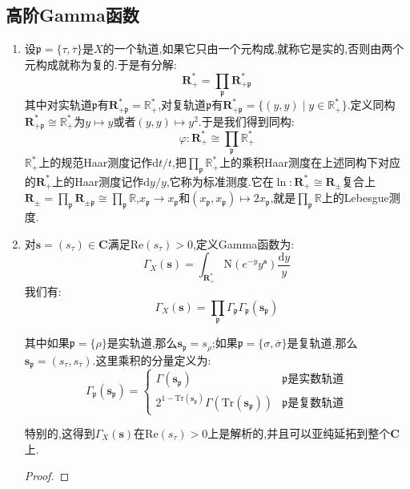 \subsection{高阶Gamma函数}
\begin{enumerate}
	\item 设$\mathfrak{p}=\{\tau,\overline{\tau}\}$是$X$的一个轨道,如果它只由一个元构成,就称它是实的,否则由两个元构成就称为复的.于是有分解:
	$$\textbf{R}_+^*=\prod_{\mathfrak{p}}\textbf{R}_{+\mathfrak{p}}^*$$
	其中对实轨道$\mathfrak{p}$有$\textbf{R}_{+\mathfrak{p}}^*=\mathbb{R}_+^*$,对复轨道$\mathfrak{p}$有$\textbf{R}_{+\mathfrak{p}}^*=\{(y,y)\mid y\in\mathbb{R}_+^*\}$.定义同构$\textbf{R}_{+\mathfrak{p}}^*\cong\mathbb{R}_+^*$为$y\mapsto y$或者$(y,y)\mapsto y^2$.于是我们得到同构:
	$$\varphi:\textbf{R}_+^*\cong\prod_{\mathfrak{p}}\mathbb{R}_+^*$$
	$\mathbb{R}_+^*$上的规范Haar测度记作$\mathrm{d}t/t$,把$\prod_{\mathfrak{p}}\mathbb{R}_+^*$上的乘积Haar测度在上述同构下对应的$\textbf{R}_+^*$上的Haar测度记作$\mathrm{d}y/y$,它称为标准测度.它在$\ln:\textbf{R}_+^*\cong\textbf{R}_{\pm}$复合上$\textbf{R}_{\pm}=\prod_{\mathfrak{p}}\textbf{R}_{\pm\mathfrak{p}}\cong\prod_{\mathfrak{p}}\mathbb{R}$,$x_{\mathfrak{p}}\to x_{\mathfrak{p}}$和$(x_{\mathfrak{p}},x_{\mathfrak{p}})\mapsto2x_{\mathfrak{p}}$,就是$\prod_{\mathfrak{p}}\mathbb{R}$上的Lebesgue测度.
	\item 对$\textbf{s}=(s_{\tau})\in\textbf{C}$满足$\mathrm{Re}(s_{\tau})>0$,定义Gamma函数为:
	$$\Gamma_X(\textbf{s})=\int_{\textbf{R}_+^*}\mathrm{N}(e^{-y}y^{\textbf{s}})\frac{\mathrm{d}y}{y}$$
	我们有:
	$$\Gamma_X(\textbf{s})=\prod_{\mathfrak{p}}\Gamma_{\mathfrak{p}}\Gamma_{\mathfrak{p}}(\textbf{s}_{\mathfrak{p}})$$
	
	其中如果$\mathfrak{p}=\{\rho\}$是实轨道,那么$\textbf{s}_{\mathfrak{p}}=s_{\rho}$;如果$\mathfrak{p}=\{\sigma,\overline{\sigma}\}$是复轨道,那么$\textbf{s}_{\mathfrak{p}}=(s_{\tau},s_{\overline{\tau}})$.这里乘积的分量定义为:
	$$\Gamma_{\mathfrak{p}}(\textbf{s}_{\mathfrak{p}})=\left\{\begin{array}{cc}\Gamma(\textbf{s}_{\mathfrak{p}})&\mathfrak{p}\text{是实数轨道}\\2^{1-\mathrm{Tr}(\textbf{s}_{\mathfrak{p}})}\Gamma(\mathrm{Tr}(\textbf{s}_{\mathfrak{p}}))&\mathfrak{p}\text{是复数轨道}\end{array}\right.$$
	
	特别的,这得到$\Gamma_X(\textbf{s})$在$\mathrm{Re}(s_{\tau})>0$上是解析的,并且可以亚纯延拓到整个$\textbf{C}$上.
	\begin{proof}
		

\end{proof}
\end{enumerate}
